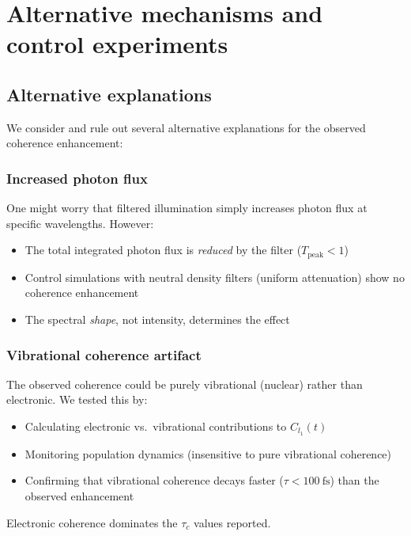 \documentclass[11pt,a4paper]{article}
\begin{document}

\section{Alternative mechanisms and control experiments}
\label{sec:S12}

\subsection{Alternative explanations}

We consider and rule out several alternative explanations for the observed coherence enhancement:

\subsubsection*{Increased photon flux}

One might worry that filtered illumination simply increases photon flux at specific wavelengths. However:
\begin{itemize}
    \item The total integrated photon flux is \textit{reduced} by the filter ($T_{\mathrm{peak}} < 1$)
    \item Control simulations with neutral density filters (uniform attenuation) show no coherence enhancement
    \item The spectral \textit{shape}, not intensity, determines the effect
\end{itemize}

\subsubsection*{Vibrational coherence artifact}

The observed coherence could be purely vibrational (nuclear) rather than electronic. We tested this by:
\begin{itemize}
    \item Calculating electronic vs.\ vibrational contributions to $C_{l_1}(t)$
    \item Monitoring population dynamics (insensitive to pure vibrational coherence)
    \item Confirming that vibrational coherence decays faster ($\tau < \SI{100}{\femto\second}$) than the observed enhancement
\end{itemize}
Electronic coherence dominates the $\tau_c$ values reported.
\end{document}
